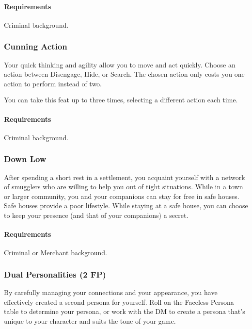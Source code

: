             \paragraph{Requirements} Criminal background.
        \subsubsection{Cunning Action} \label{feat::cunningaction}
            Your quick thinking and agility allow you to move and act quickly.
            Choose an action between Disengage, Hide, or Search.
            The chosen action only costs you one action to perform instead of two.

            You can take this feat up to three times, selecting a different action each time.
            \paragraph{Requirements} Criminal background.
        \subsubsection{Down Low} \label{feat::downlow}
            After spending a short rest in a settlement, you acquaint yourself with a network of smugglers who are willing to help you out of tight situations.
            While in a town or larger community, you and your companions can stay for free in safe houses.
            Safe houses provide a poor lifestyle.
            While staying at a safe house, you can choose to keep your presence (and that of your companions) a secret.
            \paragraph{Requirements} Criminal or Merchant background.
        \subsubsection{Dual Personalities (2 FP)} \label{feat::dualpersonalities}
            By carefully managing your connections and your appearance, you have effectively created a second persona for yourself.
            Roll on the Faceless Persona table to determine your persona, or work with the DM to create a persona that's unique to your character and suits the tone of your game.

